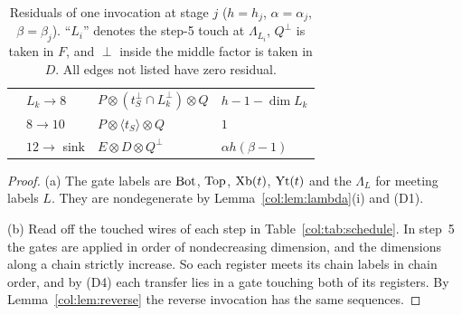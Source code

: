 \begin{table}[ht]
\begin{tabular}{@{}l l l l@{}}
 & $L_k\to8$ & $P\otimes(t_S^\perp\cap L_k^\perp)\otimes Q$ & $h-1-\dim L_k$\\
 & $8\to10$ & $P\otimes\langle t_S\rangle\otimes Q$ & $1$\\
 & $12\to$ sink & $E\otimes D\otimes Q^\perp$ & $\alpha h(\beta-1)$\\
\bottomrule
\end{tabular}
\caption{Residuals of one invocation at stage $j$ ($h=h_j$, $\alpha=\alpha_j$, $\beta=\beta_j$).
``$L_i$'' denotes the step-5 touch at $\Lambda_{L_i}$, $Q^\perp$ is taken in $F$, and $\perp$ inside the
middle factor is taken in $D$. All edges not listed have zero residual.}\label{col:tab:residuals}
\end{table}

\begin{proof}
(a) The gate labels are $\mathrm{Bot}$, $\mathrm{Top}$, $\mathrm{Xb}(t)$, $\mathrm{Yt}(t)$ and the $\Lambda_L$ for meeting
labels $L$. They are nondegenerate by Lemma~\ref{col:lem:lambda}(i) and (D1).

(b) Read off the touched wires of each step in Table~\ref{col:tab:schedule}. In step~5 the gates are
applied in order of nondecreasing dimension, and the dimensions along a chain strictly increase. So each
register meets its chain labels in chain order, and by (D4) each transfer lies in a gate touching both
of its registers. By Lemma~\ref{col:lem:reverse} the reverse invocation has the same sequences.


\end{proof}
